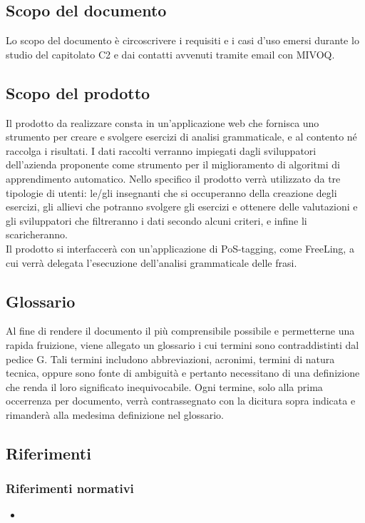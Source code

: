 \subsection{Scopo del documento}
Lo scopo del documento è circoscrivere i requisiti e i casi d’uso emersi durante lo studio del capitolato C2 e dai contatti avvenuti tramite email con MIVOQ.
\subsection{Scopo del prodotto}
Il prodotto da realizzare consta in un’applicazione web che fornisca uno strumento per creare e svolgere esercizi di analisi grammaticale, e al contento né raccolga i risultati. I dati raccolti verranno impiegati dagli sviluppatori dell’azienda proponente come strumento per il miglioramento di algoritmi di {apprendimento automatico}. Nello specifico il prodotto verrà utilizzato da tre tipologie di utenti:
le/gli insegnanti che si occuperanno della creazione degli esercizi,
gli allievi che potranno svolgere gli esercizi e ottenere delle valutazioni e gli sviluppatori che filtreranno i dati secondo alcuni criteri, e infine li scaricheranno.\\Il prodotto si interfaccerà con un’applicazione di {PoS-tagging}, come {FreeLing}, a cui verrà delegata l’esecuzione dell’analisi grammaticale delle frasi.
\subsection{Glossario}
Al fine di rendere il documento il più comprensibile possibile e permetterne una rapida fruizione, viene allegato un glossario i cui termini sono contraddistinti dal pedice G. Tali termini includono abbreviazioni, acronimi, termini di natura tecnica, oppure sono fonte di ambiguità e pertanto necessitano di una definizione che renda il loro significato inequivocabile. 
Ogni termine, solo alla prima occerrenza per documento, verrà contrassegnato con la dicitura sopra indicata e rimanderà alla medesima definizione nel glossario.
\subsection{Riferimenti}
\subsubsection{Riferimenti normativi}
\begin{itemize}
\item \NdPv
\end{itemize}
